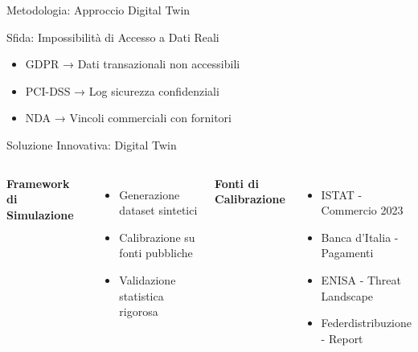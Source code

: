\documentclass[aspectratio=169,10pt]{beamer}
\begin{document}
\begin{frame}{Metodologia: Approccio Digital Twin}

\begin{alertblock}{Sfida: Impossibilità di Accesso a Dati Reali}
\begin{itemize}
    \item GDPR → Dati transazionali non accessibili
    \item PCI-DSS → Log sicurezza confidenziali
    \item NDA → Vincoli commerciali con fornitori
\end{itemize}
\end{alertblock}

\begin{block}{Soluzione Innovativa: Digital Twin}
\begin{columns}[T]
\textbf{Framework di Simulazione}
\begin{itemize}
    \item Generazione dataset sintetici
    \item Calibrazione su fonti pubbliche
    \item Validazione statistica rigorosa
\end{itemize}

\textbf{Fonti di Calibrazione}
\begin{itemize}
    \item ISTAT - Commercio 2023
    \item Banca d'Italia - Pagamenti
    \item ENISA - Threat Landscape
    \item Federdistribuzione - Report
\end{itemize}
\end{columns}
\end{block}

\begin{center}
\end{center}
\end{frame}
\end{document}
